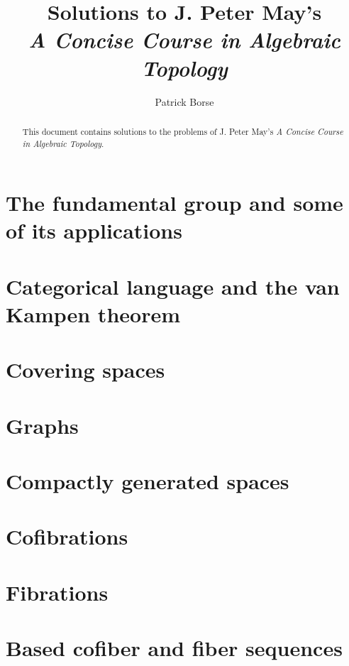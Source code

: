 \documentclass[oneside]{amsbook}
\title{Solutions to J. Peter May's\\ \emph{A Concise Course in Algebraic Topology}}
\author{Patrick Borse}
\begin{document}
\begin{abstract}
This document contains solutions to the problems of J. Peter May's \emph{A Concise Course in Algebraic Topology}.
\end{abstract}

\maketitle

\tableofcontents

\chapter{The fundamental group and some of its applications}


\chapter{Categorical language and the van Kampen theorem}


\chapter{Covering spaces}


\chapter{Graphs}


\chapter{Compactly generated spaces}


\chapter{Cofibrations}


\chapter{Fibrations}


\chapter{Based cofiber and fiber sequences}

\end{document}
